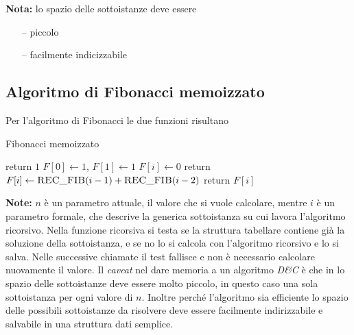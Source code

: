 \textbf{Nota:} lo spazio delle sottoistanze deve essere 
\begin{itemize}[noitemsep,topsep=0pt,parsep=0pt,partopsep=0pt]
    \item[--] piccolo
    \item[--] facilmente indicizzabile
\end{itemize}

\subsection{Algoritmo di Fibonacci memoizzato}

Per l'algoritmo di Fibonacci le due funzioni risultano
\begin{algorithm}[H]
\caption{Fibonacci memoizzato}\label{alg:fibmemoizzato}
\begin{algorithmic}[1]
            \State return $1$
        \EndIf
        \State $F[0] \gets 1$, $F[1] \gets 1$
            \State $F[i] \gets 0$
        \EndFor
        \State return 
    \EndProcedure
            \State $F[i] \gets \Call{REC\_FIB}{i-1} + \Call{REC\_FIB}{i-2} $
        \EndIf
        \State return $F[i]$
    \EndProcedure
\end{algorithmic}
\end{algorithm}
\textbf{Note:}
$n$ è un parametro attuale, il valore che si vuole calcolare, mentre $i$ è un parametro formale, che descrive la generica sottoistanza su cui lavora l'algoritmo ricorsivo.
Nella funzione ricorsiva si testa se la struttura tabellare contiene già la soluzione della sottoistanza, e se no lo si calcola con l'algoritmo ricorsivo e lo si salva. Nelle successive chiamate il test fallisce e non è necessario calcolare nuovamente il valore.
Il \emph{caveat} nel dare memoria a un algoritmo \emph{D\&C} è che in lo spazio delle sottoistanze deve essere molto piccolo, in questo caso una sola sottoistanza per ogni valore di $n$. Inoltre perché l'algoritmo sia efficiente lo spazio delle possibili sottoistanze da risolvere deve essere facilmente indirizzabile e salvabile in una struttura dati semplice.

